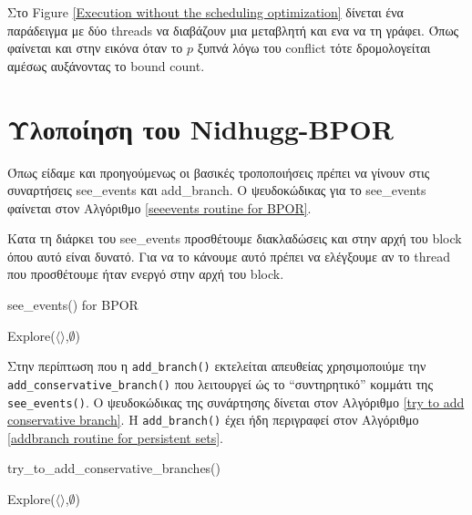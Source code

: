 
Στο Figure \ref{Execution without the scheduling optimization} δίνεται ένα παράδειγμα με δύο threads να διαβάζουν μια μεταβλητή και 
ενα να τη γράφει. Όπως φαίνεται και στην εικόνα όταν το $p$ ξυπνά λόγω του conflict τότε δρομολογείται αμέσως αυξάνοντας το bound count.

\section{Υλοποίηση του Nidhugg-BPOR}

Όπως είδαμε και προηγούμενως οι βασικές τροποποιήσεις πρέπει να γίνουν στις συναρτήσεις see\_events και add\_branch. 
Ο ψευδοκώδικας για το see\_events φαίνεται στον Αλγόριθμο
\ref{seeevents routine for BPOR}.

Κατα τη διάρκει του see\_events προσθέτουμε διακλαδώσεις και στην αρχή του block όπου αυτό είναι δυνατό. Για να το κάνουμε 
αυτό πρέπει να ελέγξουμε αν το thread που προσθέτουμε ήταν ενεργό στην αρχή του block.

\begin{algorithm}[H]
    \caption{see\_events() for BPOR}
    \label{seeevents routine for BPOR}
    Explore($\langle \rangle$,$\emptyset$)\;
\end{algorithm}

Στην περίπτωση που η \verb|add_branch()| εκτελείται απευθείας χρησιμοποιύμε την \verb|add_conservative_branch()| που λειτουργεί ώς το ``συντηρητικό''
κομμάτι της \verb|see_events()|. Ο ψευδοκώδικας της συνάρτησης δίνεται στον Αλγόριθμο \ref{try to add conservative branch}.
Η \verb|add_branch()| έχει ήδη περιγραφεί στον Αλγόριθμο \ref{addbranch routine for persistent sets}.

\begin{algorithm}[H]
    \caption{try\_to\_add\_conservative\_branches()}
    \label{try to add conservative branch}
    Explore($\langle \rangle$,$\emptyset$)\;
\end{algorithm}

